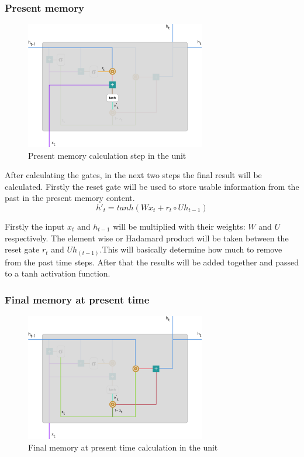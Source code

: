 \subsubsection{Present memory}

\begin{figure}[htp]
	\centering
	\includegraphics[width=0.7\textwidth]{Illustrations/GRUpresentmemory.png}
	\caption{Present memory calculation step in the unit}
	\label{fig:GRUpresentmemory}
\end{figure}

After calculating the gates, in the next two steps the final result will be calculated.
Firstly the reset gate will be used to store usable information from the past in the present memory content.
\begin{equation}
h'_t=tanh(Wx_t+r_t \circ Uh_{t-1})
\end{equation}

Firstly the input $x_t$ and $h_{t-1}$ will be multiplied with their weights: $W$ and $U$ respectively. The element wise or Hadamard product will be taken between the reset gate $r_t$ and $Uh_{(t-1)}$.This will basically determine how much to remove from the past time steps. After that the results will be added together and passed to a tanh activation function.

\subsubsection{Final memory at present time}

\begin{figure}[htp]
	\centering
	\includegraphics[width=0.7\textwidth]{Illustrations/GRUlaststep.png}
	\caption{Final memory at present time calculation in the unit}
	\label{fig:GRUlaststep}
\end{figure}

